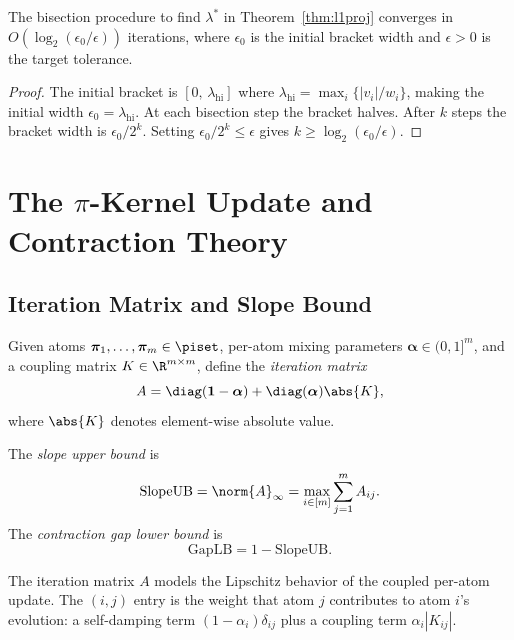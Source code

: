 \documentclass[11pt]{article}
\begin{document}
\begin{proposition}
\label{prop:bisect}
The bisection procedure to find $\lambda^*$ in Theorem~\ref{thm:l1proj}
converges in $O(\log_2(\epsilon_0/\epsilon))$ iterations, where $\epsilon_0$
is the initial bracket width and $\epsilon>0$ is the target tolerance.
\end{proposition}

\begin{proof}
The initial bracket is $[0,\,\lambda_{\mathrm{hi}}]$ where
$\lambda_{\mathrm{hi}} = \max_i\{|v_i|/w_i\}$, making the initial width
$\epsilon_0 = \lambda_{\mathrm{hi}}$.  At each bisection step the bracket
halves.  After $k$ steps the bracket width is $\epsilon_0/2^k$.  Setting
$\epsilon_0/2^k \leq \epsilon$ gives $k \geq \log_2(\epsilon_0/\epsilon)$.
\end{proof}

\section{The $\pi$-Kernel Update and Contraction Theory}

\subsection{Iteration Matrix and Slope Bound}

\begin{definition}
Given atoms $\bm{\pi}_1,\dots,\bm{\pi}_m\in\piset$, per-atom mixing
parameters $\bm{\alpha}\in(0,1]^m$, and a coupling matrix
$K\in\R^{m\times m}$, define the \emph{iteration matrix}
\[
  A = \diag(\bm{1}-\bm{\alpha}) + \diag(\bm{\alpha})\abs{K},
\]
where $\abs{K}$ denotes element-wise absolute value.
\end{definition}

\begin{definition}
The \emph{slope upper bound} is
\[
  \mathrm{SlopeUB} = \norm{A}_\infty = \max_{i\in[m]}\sum_{j=1}^m A_{ij}.
\]
The \emph{contraction gap lower bound} is
\[
  \mathrm{GapLB} = 1 - \mathrm{SlopeUB}.
\]
\end{definition}

\begin{remark}
The iteration matrix $A$ models the Lipschitz behavior of the coupled
per-atom update.  The $(i,j)$ entry is the weight that atom $j$
contributes to atom $i$'s evolution: a self-damping term
$(1-\alpha_i)\delta_{ij}$ plus a coupling term $\alpha_i|K_{ij}|$.
\end{remark}
\end{document}
